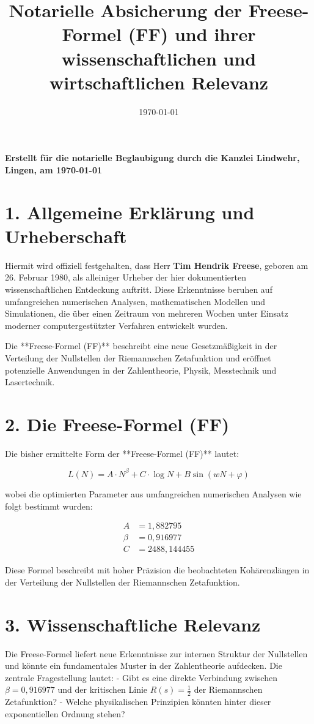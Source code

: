 \documentclass[a4paper,12pt]{article}
\title{\textbf{Notarielle Absicherung der Freese-Formel (FF) und ihrer wissenschaftlichen und wirtschaftlichen Relevanz}}
\author{}
\date{\today}
\begin{document}
\maketitle
\begin{center}
\textbf{Erstellt für die notarielle Beglaubigung durch die Kanzlei Lindwehr, Lingen, am \today}
\end{center}

\section*{1. Allgemeine Erklärung und Urheberschaft}
Hiermit wird offiziell festgehalten, dass Herr \textbf{Tim Hendrik Freese}, geboren am 26. Februar 1980, als alleiniger Urheber der hier dokumentierten wissenschaftlichen Entdeckung auftritt. Diese Erkenntnisse beruhen auf umfangreichen numerischen Analysen, mathematischen Modellen und Simulationen, die über einen Zeitraum von mehreren Wochen unter Einsatz moderner computergestützter Verfahren entwickelt wurden.

Die **Freese-Formel (FF)** beschreibt eine neue Gesetzmäßigkeit in der Verteilung der Nullstellen der Riemannschen Zetafunktion und eröffnet potenzielle Anwendungen in der Zahlentheorie, Physik, Messtechnik und Lasertechnik.

\section*{2. Die Freese-Formel (FF)}
Die bisher ermittelte Form der **Freese-Formel (FF)** lautet:

\begin{equation}
L(N) = A \cdot N^{\beta} + C \cdot \log N + B \sin(wN + \varphi)
\end{equation}

wobei die optimierten Parameter aus umfangreichen numerischen Analysen wie folgt bestimmt wurden:

\begin{align*}
A &= 1,882795 \\
\beta &= 0,916977 \\
C &= 2488,144455
\end{align*}

Diese Formel beschreibt mit hoher Präzision die beobachteten Kohärenzlängen in der Verteilung der Nullstellen der Riemannschen Zetafunktion.

\section*{3. Wissenschaftliche Relevanz}
Die Freese-Formel liefert neue Erkenntnisse zur internen Struktur der Nullstellen und könnte ein fundamentales Muster in der Zahlentheorie aufdecken. Die zentrale Fragestellung lautet:
- Gibt es eine direkte Verbindung zwischen $\beta = 0,916977$ und der kritischen Linie $R(s) = \frac{1}{2}$ der Riemannschen Zetafunktion?
- Welche physikalischen Prinzipien könnten hinter dieser exponentiellen Ordnung stehen?
\end{document}
